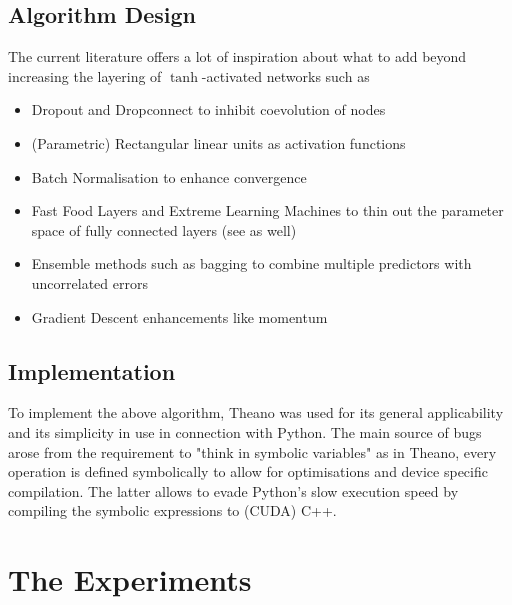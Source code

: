 \documentclass[]{article}
\begin{document}
\subsection{Algorithm Design}
The current literature offers a lot of inspiration about what to add beyond increasing the layering of $\tanh$-activated networks such as 
\begin{itemize}
	\item Dropout \cite{Hinton2012,Srivastava2014} and Dropconnect \cite{Wan2013} to inhibit coevolution of nodes
	\item (Parametric) \cite{He2015} Rectangular linear units as activation functions \cite{Nair2010}
	\item Batch Normalisation \cite{Ioffe2015} to enhance convergence
	\item Fast Food Layers \cite{Yang2014} and Extreme Learning Machines \cite{Huang2006} to thin out the parameter space of fully connected layers (see \cite{Denil2013} as well)
	\item Ensemble methods such as bagging \cite{Breiman1996} to combine multiple predictors with uncorrelated errors
	\item Gradient Descent enhancements like momentum \cite{IlyaSutskever}
\end{itemize}
\subsection{Implementation}
To implement the above algorithm, Theano \cite{Bergstra2010} was used for its general applicability and its simplicity in use in connection with Python. The main source of bugs arose from the requirement to "think in symbolic variables" as in Theano, every operation is defined symbolically to allow for optimisations and device specific compilation. The latter allows to evade Python's slow execution speed by compiling the symbolic expressions to (CUDA) C++.
\section{The Experiments}


\end{document}
